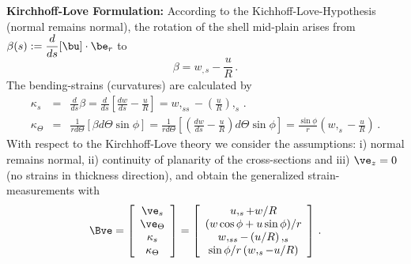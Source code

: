 {\bf Kirchhoff-Love Formulation:} 
According to the Kichhoff-Love-Hypothesis (normal remains normal), 
the rotation of the shell mid-plain arises from 
$\beta (s) := \dfrac{d}{ds} [\bu]
\cdot \be_r$ to 
\begin{equation}
\beta =   w_{,s} - \frac{u}{R} \, .
\end{equation}
The bending-strains (curvatures) are calculated by
\begin{eqnarray}
\kappa_s 
& = &\frac{d}{ds} \beta 
  = \frac{d}{ds} \left[   \frac{dw}{ds} - \frac{u}{R} \right] 
  =   w,_{ss} - \left( \frac{u}{R} \right),_s \, . \\
\kappa_\Theta 
& = & \frac{1}{r d \Theta} \left[ \beta d \Theta \sin \phi \right] 
= \frac{1}{r d \Theta} \left[ \left(   \frac{dw}{ds} 
        - \frac{u}{R} \right) d \Theta \sin \phi\right]
=   \frac{\sin \phi}{r} \left( w,_s - \frac{u}{R} \right) \, .
\end{eqnarray}
With respect to the Kirchhoff-Love theory we consider the 
assumptions: 
i) normal remains normal, 
ii) continuity of planarity of the cross-sections and 
iii) $\ve_z = 0$ (no strains in thickness direction), 
and obtain the generalized strain-measurements with
\begin{equation}
\Bve = 
\left[ 
\begin{array}{c}
\ve_s \\ \ve_\Theta \\ \kappa_s \\ \kappa_\Theta
\end{array}
\right] = \left[ 
\begin{array}{c}
u,_s + w/R \\
(w \cos \phi + u \sin \phi)/r \\
  w,_{ss} - \left( u/R \right),_s \\
  \sin \phi/r \left( w,_s - u/R \right)
\end{array}
\right] \, . 
\end{equation}

